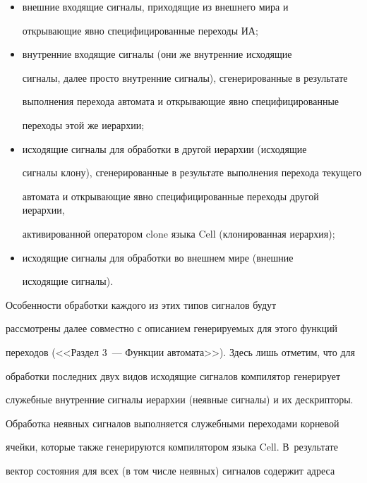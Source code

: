       \begin{itemize}


      \item внешние входящие сигналы, приходящие из внешнего мира и 


открывающие явно специфицированные переходы ИА;


      \item внутренние входящие сигналы (они же внутренние исходящие 


сигналы, далее просто внутренние сигналы), сгенерированные в результате 


выполнения перехода автомата и открывающие явно специфицированные 


переходы этой же иерархии;


      \item исходящие сигналы для обработки в другой иерархии (исходящие 


сигналы клону), сгенерированные в результате выполнения перехода текущего 


автомата и открывающие явно специфицированные переходы другой иерархии, 


активированной оператором clone языка Cell (клонированная иерархия);


      \item исходящие сигналы для обработки во внешнем мире (внешние 


исходящие сигналы).


      \end{itemize}


      


      Особенности обработки каждого из этих типов сигналов будут 


рассмотрены далее совместно с описанием генерируемых для этого функций 


переходов (<<Раздел 3~--- Функции автомата>>). Здесь лишь отметим, что для 


обработки последних двух видов исходящие сигналов компилятор генерирует 


служебные внутренние сигналы иерархии (неявные сигналы) и их дескрипторы. 


Обработка неявных сигналов выполняется служебными переходами корневой 


ячейки, которые также генерируются компилятором языка Cell. В~результате 


вектор состояния для всех (в том числе неявных) сигналов содержит адреса 


